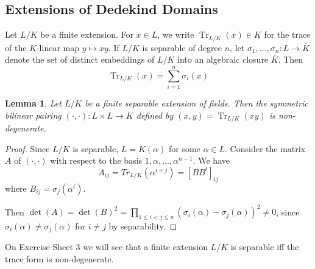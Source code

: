 \documentclass[11pt]{article}
\theoremstyle{definition}
\theoremstyle{plain}
\newtheorem{lemma}[definition]{Lemma}
\theoremstyle{remark}
\DeclareMathOperator{\Tr}{Tr}
\begin{document}
\subsection{Extensions of Dedekind Domains}

Let $L / K$ be a finite extension. For $x \in L$, we write $\Tr_{L/K}(x) \in K$ for the trace of the $K$-linear map $y \mapsto x y$. If $L/K$ is separable of degree $n$, let $\sigma_1, \ldots, \sigma_n : L \to \overline{K}$ denote the set of distinct embeddings of $L/K$ into an algebraic closure $\overline{K}$. Then
\begin{equation*}
    \Tr_{L/K}(x) = \sum_{i=1}^n \sigma_i(x)
\end{equation*}

\begin{lemma}\label{lem:10_1}
    Let $L / K$ be a finite separable extension of fields. Then the symmetric bilinear pairing $(\cdot, \cdot) : L \times L \to K$ defined by $(x, y) = \Tr_{L/K}(xy)$ is non-degenerate.
\end{lemma}
\begin{proof}
    Since $L/K$ is separable, $L = K(\alpha)$ for some $\alpha \in L$. Consider the matrix $A$ of $(\cdot, \cdot)$ with respect to the basis $1, \alpha, \ldots, \alpha^{n-1}$. We have
    \begin{equation*}
        A_{ij} = Tr_{L/K}(\alpha^{i+j}) = [B B^t]_{ij}
    \end{equation*}
    where $B_{ij} = \sigma_j(\alpha^i)$.

    Then $\det(A) = \det(B)^2 = \prod_{1 \le i < j \le n} (\sigma_i(\alpha) - \sigma_j(\alpha))^2 \neq 0$, since $\sigma_i(\alpha) \neq \sigma_j(\alpha)$ for $i \neq j$ by separability.
\end{proof}

On Exercise Sheet 3 we will see that a finite extension $L/K$ is separable iff the trace form is non-degenerate.
\end{document}
